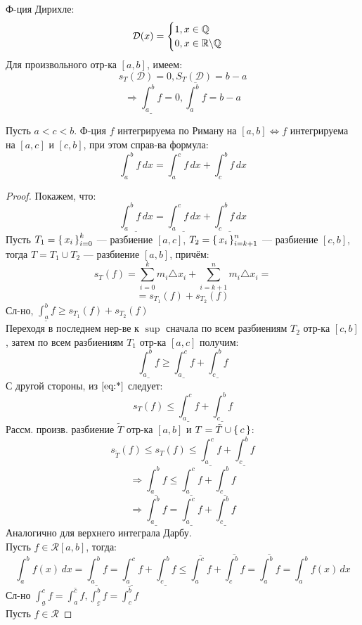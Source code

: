 \begin{example}
Ф-ция Дирихле:
\[
\mathcal{D}(x) = \begin{cases}
1, x \in \mathbb{Q} \\
0, x \in \mathbb{R} \backslash \mathbb{Q}
\end{cases}
\]
Для произвольного отр-ка $[a, b]$, имеем:
\[
s_T(\mathcal{D}) = 0, S_T(\mathcal{D}) = b - a
\]
\[
\Rightarrow \underline{\int_{a}^{b} f} = 0, \overline{\int_{a}^{b} f} = b - a
\]
\end{example}
\begin{consequence}
  Пусть $a < c < b$. Ф-ция $f$ интегрируема по Риману на $[a, b] \iff f $ интегрируема на $[a, c]$ и $[c, b]$, при этом справ-ва формула:
  \[
    \int_{a}^{b} f \, dx = \int_{a}^{c} f \, dx + \int_{c}^{b} f \, dx
  \]
\end{consequence}
\begin{proof}
Покажем, что:
\[
  \underline{\int_{a}^{b} f \, dx} = \underline{\int_{a}^{c} f \, dx} + \underline{\int_{c}^{b} f \, dx}
\]
Пусть $T_1 = \set{x_i}_{i = 0}^{k}$ --- разбиение $[a, c]$, $T_2 = \set{x_i}_{i = k + 1}^{n}$ --- разбиение $[c, b]$, тогда $T = T_1 \cup T_2$ --- разбиение $[a, b]$, причём:
\[
s_{T}(f) = \sum_{i = 0}^{k} m_i \triangle x_i + \sum_{i = k + 1}^{n} m_i \triangle x_i = 
\]
\begin{equation}
  \label{eq:*}
  = s_{T_1}(f) + s_{T_2}(f)
\end{equation}
Сл-но, $\underline{\int_{a}^{b} f} \geq s_{T_1}(f) + s_{T_2}(f)$ \\
Переходя в последнем нер-ве к $\sup$ сначала по всем разбиениям $T_2$ отр-ка $[c, b]$, затем по всем разбиениям $T_1$ отр-ка $[a, c]$ получим:
\[
\underline{\int_{a}^{b} f} \geq \underline{\int_{a}^{c} f} + \underline{\int_{c}^{b} f}
\]
С другой стороны, из $\eqref{eq:*}$ следует:
\[
s_T(f) \leq \underline{\int_{a}^{c} f} + \underline{\int_{c}^{b} f}
\]
Рассм. произв. разбиение $\tilde{T}$ отр-ка $[a, b]$ и $T = \tilde{T} \cup \set{c}$:
\[
s_{\tilde{T}}(f) \leq s_{T}(f) \leq \underline{\int_{a}^{c} f} + \underline{\int_{c}^{b} f}
\]
\[
\Rightarrow \underline{\int_{a}^{b} f} \leq \underline{\int_{a}^{c} f} + \underline{\int_{c}^{b} f}
\]
\[
\Rightarrow  \underline{\int_{a}^{b} f} = \underline{\int_{a}^{c} f} + \underline{\int_{c}^{b} f}
\]
Аналогично для верхнего интеграла Дарбу. \\
Пусть $f \in \mathcal{R}[a, b]$, тогда:
\[
  \int_{a}^{b} f(x) \, dx = \underline{\int_{a}^{b} f} = \underline{\int_{a}^{c} f} + \underline{\int_{c}^{b} f} \leq \overline{\int_{a}^{c} f} + \overline{\int_{c}^{b} f} = \overline{\int_{a}^{b} f} = \int_{a}^{b} f(x) \, dx
\]
Сл-но $\underline{\int_{a}^{c} f} = \overline{\int_{a}^{c} f}, \underline{\int_{c}^{b} f} = \overline{\int_{c}^{b} f}$ \\
Пусть $f \in \mathcal{R}$
\end{proof}
